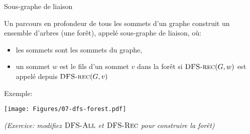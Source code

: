 \begin{frame}{Sous-graphe de liaison}

Un parcours en profondeur de tous les sommets d'un graphe construit un
ensemble d'arbres (une \alert{forêt}), appelé sous-graphe de liaison, où:
\begin{itemize}
\item les sommets sont les sommets du graphe,
\item un sommet $w$ est le fils d'un sommet $v$ dans la forêt si
  $\textnormal{\scshape DFS-rec}(G,w)$ est appelé depuis $\textnormal{\scshape DFS-rec}(G,v)$
\end{itemize}

\bigskip

Exemple:

\centerline{\texttt{[image: Figures/07-dfs-forest.pdf]}}

\bigskip

{\it (Exercice: modifiez $\textnormal{\scshape DFS-All}$ et $\textnormal{\scshape DFS-Rec}$ pour construire la forêt)}

\end{frame}



